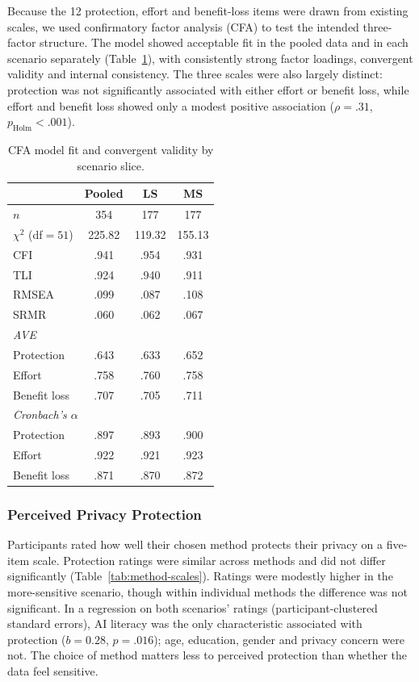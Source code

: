 \documentclass[conference,compsoc]{IEEEtran}
\begin{document}
Because the 12 protection, effort and benefit-loss items were drawn from existing scales, we used confirmatory factor analysis (CFA) to test the intended three-factor structure. The model showed acceptable fit in the pooled data and in each scenario separately (Table~\ref{tab:cfa-fit}), with consistently strong factor loadings, convergent validity and internal consistency. The three scales were also largely distinct: protection was not significantly associated with either effort or benefit loss, while effort and benefit loss showed only a modest positive association ($\rho=.31$, $p_{\mathrm{Holm}}<.001$).

\begin{table}[t]
\centering
\caption{CFA model fit and convergent validity by scenario slice.}
\label{tab:cfa-fit}
\small
\setlength{\tabcolsep}{4pt}
\begin{tabular}{lccc}
\toprule
 & Pooled & LS & MS \\
\midrule
$n$ & 354 & 177 & 177 \\
$\chi^2$ (df${}=51$) & 225.82 & 119.32 & 155.13 \\
CFI & .941 & .954 & .931 \\
TLI & .924 & .940 & .911 \\
RMSEA & .099 & .087 & .108 \\
SRMR & .060 & .062 & .067 \\
\midrule
\multicolumn{4}{l}{\textit{AVE}} \\
\quad Protection & .643 & .633 & .652 \\
\quad Effort & .758 & .760 & .758 \\
\quad Benefit loss & .707 & .705 & .711 \\
\midrule
\multicolumn{4}{l}{\textit{Cronbach's $\alpha$}} \\
\quad Protection & .897 & .893 & .900 \\
\quad Effort & .922 & .921 & .923 \\
\quad Benefit loss & .871 & .870 & .872 \\
\bottomrule
\end{tabular}
\end{table}

\subsubsection{Perceived Privacy Protection}

Participants rated how well their chosen method protects their privacy on a five-item scale. Protection ratings were similar across methods and did not differ significantly (Table~\ref{tab:method-scales}). Ratings were modestly higher in the more-sensitive scenario, though within individual methods the difference was not significant. In a regression on both scenarios' ratings (participant-clustered standard errors), AI literacy was the only characteristic associated with protection ($b=0.28$, $p=.016$); age, education, gender and privacy concern were not. The choice of method matters less to perceived protection than whether the data feel sensitive.
\end{document}
